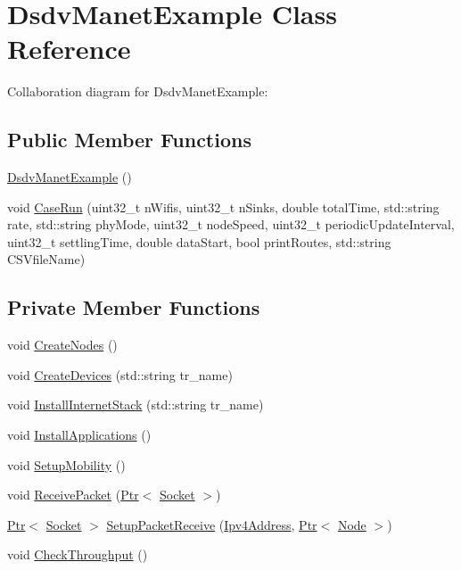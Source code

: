 \hypertarget{classDsdvManetExample}{}\section{Dsdv\+Manet\+Example Class Reference}
\label{classDsdvManetExample}


Collaboration diagram for Dsdv\+Manet\+Example\+:
\subsection*{Public Member Functions}
\begin{DoxyCompactItemize}
\item 
\hyperlink{classDsdvManetExample_afe8a78754f4aafbd3f1ee37aa77ba9ba}{Dsdv\+Manet\+Example} ()
\item 
void \hyperlink{classDsdvManetExample_aa61b3622afce14d04f2cf656fba31f4d}{Case\+Run} (uint32\+\_\+t n\+Wifis, uint32\+\_\+t n\+Sinks, double total\+Time, std\+::string rate, std\+::string phy\+Mode, uint32\+\_\+t node\+Speed, uint32\+\_\+t periodic\+Update\+Interval, uint32\+\_\+t settling\+Time, double data\+Start, bool print\+Routes, std\+::string C\+S\+Vfile\+Name)
\end{DoxyCompactItemize}
\subsection*{Private Member Functions}
\begin{DoxyCompactItemize}
\item 
void \hyperlink{classDsdvManetExample_a719136b1bb8a1d9fe28d12ba785a0390}{Create\+Nodes} ()
\item 
void \hyperlink{classDsdvManetExample_a9fb80e0db3a88ca03cf832331cfc89ba}{Create\+Devices} (std\+::string tr\+\_\+name)
\item 
void \hyperlink{classDsdvManetExample_a81e2a6a60033ea5e4f630c8805cd9586}{Install\+Internet\+Stack} (std\+::string tr\+\_\+name)
\item 
void \hyperlink{classDsdvManetExample_a0ad1c4265d2a60564491d137832f273b}{Install\+Applications} ()
\item 
void \hyperlink{classDsdvManetExample_ac515dc772b05a1a46122c97406c9d655}{Setup\+Mobility} ()
\item 
void \hyperlink{classDsdvManetExample_a73713d782113b78d3ab6419b7157f731}{Receive\+Packet} (\hyperlink{classns3_1_1Ptr}{Ptr}$<$ \hyperlink{classns3_1_1Socket}{Socket} $>$)
\item 
\hyperlink{classns3_1_1Ptr}{Ptr}$<$ \hyperlink{classns3_1_1Socket}{Socket} $>$ \hyperlink{classDsdvManetExample_accb9cb9874f2e7ef558da654896f8209}{Setup\+Packet\+Receive} (\hyperlink{classns3_1_1Ipv4Address}{Ipv4\+Address}, \hyperlink{classns3_1_1Ptr}{Ptr}$<$ \hyperlink{classns3_1_1Node}{Node} $>$)
\item 
void \hyperlink{classDsdvManetExample_ab5d63dc94628b172ffc155db71323450}{Check\+Throughput} ()
\end{DoxyCompactItemize}
